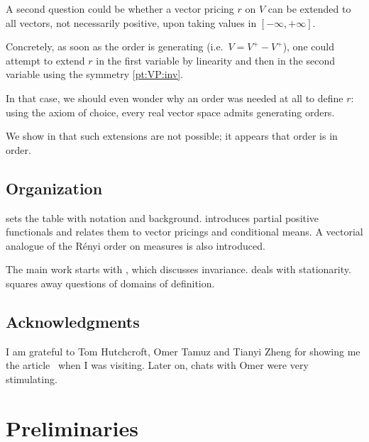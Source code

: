\documentclass[11pt]{amsart}
\numberwithin{equation}{section}
\theoremstyle{definition}
\theoremstyle{definition}
\begin{document}
\medskip
A second question could be whether a vector pricing $r$ on $V$ can be extended to all vectors, not necessarily positive, upon taking values in $[-\infty, +\infty]$.

Concretely, as soon as the order is generating (i.e.\ $V=V^+-V^+$), one could attempt to extend $r$ in the first variable by linearity and then in the second variable using the symmetry \ref{pt:VP:inv}.

In that case, we should even wonder why an order was needed at all to define $r$: using the axiom of choice, every real vector space admits generating orders.

We show in  that such extensions are not possible; it appears that order is in order.



\subsection*{Organization}%
 sets the table with notation and background.  introduces partial positive functionals and relates them to vector pricings and conditional means. A vectorial analogue of the R{\'e}nyi order on measures is also introduced. 

The main work starts with , which discusses invariance.  deals with stationarity.  squares away questions of domains of definition.

\subsection*{Acknowledgments}%
I am grateful to Tom Hutchcroft, Omer Tamuz and Tianyi Zheng for showing me the article~\cite{Alhalimi-Hutchcroft-Pan-Tamuz-Zheng_pre} when I was visiting. Later on, chats with Omer were very stimulating.

\newpage
\section{Preliminaries}\label{sec:prelim}%
\end{document}
